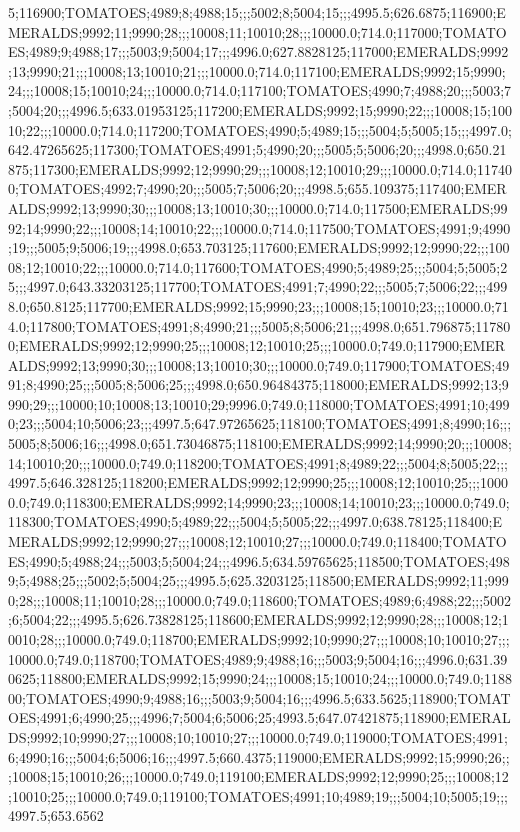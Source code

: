 5;116900;TOMATOES;4989;8;4988;15;;;5002;8;5004;15;;;4995.5;626.6875;116900;EMERALDS;9992;11;9990;28;;;10008;11;10010;28;;;10000.0;714.0;117000;TOMATOES;4989;9;4988;17;;;5003;9;5004;17;;;4996.0;627.8828125;117000;EMERALDS;9992;13;9990;21;;;10008;13;10010;21;;;10000.0;714.0;117100;EMERALDS;9992;15;9990;24;;;10008;15;10010;24;;;10000.0;714.0;117100;TOMATOES;4990;7;4988;20;;;5003;7;5004;20;;;4996.5;633.01953125;117200;EMERALDS;9992;15;9990;22;;;10008;15;10010;22;;;10000.0;714.0;117200;TOMATOES;4990;5;4989;15;;;5004;5;5005;15;;;4997.0;642.47265625;117300;TOMATOES;4991;5;4990;20;;;5005;5;5006;20;;;4998.0;650.21875;117300;EMERALDS;9992;12;9990;29;;;10008;12;10010;29;;;10000.0;714.0;117400;TOMATOES;4992;7;4990;20;;;5005;7;5006;20;;;4998.5;655.109375;117400;EMERALDS;9992;13;9990;30;;;10008;13;10010;30;;;10000.0;714.0;117500;EMERALDS;9992;14;9990;22;;;10008;14;10010;22;;;10000.0;714.0;117500;TOMATOES;4991;9;4990;19;;;5005;9;5006;19;;;4998.0;653.703125;117600;EMERALDS;9992;12;9990;22;;;10008;12;10010;22;;;10000.0;714.0;117600;TOMATOES;4990;5;4989;25;;;5004;5;5005;25;;;4997.0;643.33203125;117700;TOMATOES;4991;7;4990;22;;;5005;7;5006;22;;;4998.0;650.8125;117700;EMERALDS;9992;15;9990;23;;;10008;15;10010;23;;;10000.0;714.0;117800;TOMATOES;4991;8;4990;21;;;5005;8;5006;21;;;4998.0;651.796875;117800;EMERALDS;9992;12;9990;25;;;10008;12;10010;25;;;10000.0;749.0;117900;EMERALDS;9992;13;9990;30;;;10008;13;10010;30;;;10000.0;749.0;117900;TOMATOES;4991;8;4990;25;;;5005;8;5006;25;;;4998.0;650.96484375;118000;EMERALDS;9992;13;9990;29;;;10000;10;10008;13;10010;29;9996.0;749.0;118000;TOMATOES;4991;10;4990;23;;;5004;10;5006;23;;;4997.5;647.97265625;118100;TOMATOES;4991;8;4990;16;;;5005;8;5006;16;;;4998.0;651.73046875;118100;EMERALDS;9992;14;9990;20;;;10008;14;10010;20;;;10000.0;749.0;118200;TOMATOES;4991;8;4989;22;;;5004;8;5005;22;;;4997.5;646.328125;118200;EMERALDS;9992;12;9990;25;;;10008;12;10010;25;;;10000.0;749.0;118300;EMERALDS;9992;14;9990;23;;;10008;14;10010;23;;;10000.0;749.0;118300;TOMATOES;4990;5;4989;22;;;5004;5;5005;22;;;4997.0;638.78125;118400;EMERALDS;9992;12;9990;27;;;10008;12;10010;27;;;10000.0;749.0;118400;TOMATOES;4990;5;4988;24;;;5003;5;5004;24;;;4996.5;634.59765625;118500;TOMATOES;4989;5;4988;25;;;5002;5;5004;25;;;4995.5;625.3203125;118500;EMERALDS;9992;11;9990;28;;;10008;11;10010;28;;;10000.0;749.0;118600;TOMATOES;4989;6;4988;22;;;5002;6;5004;22;;;4995.5;626.73828125;118600;EMERALDS;9992;12;9990;28;;;10008;12;10010;28;;;10000.0;749.0;118700;EMERALDS;9992;10;9990;27;;;10008;10;10010;27;;;10000.0;749.0;118700;TOMATOES;4989;9;4988;16;;;5003;9;5004;16;;;4996.0;631.390625;118800;EMERALDS;9992;15;9990;24;;;10008;15;10010;24;;;10000.0;749.0;118800;TOMATOES;4990;9;4988;16;;;5003;9;5004;16;;;4996.5;633.5625;118900;TOMATOES;4991;6;4990;25;;;4996;7;5004;6;5006;25;4993.5;647.07421875;118900;EMERALDS;9992;10;9990;27;;;10008;10;10010;27;;;10000.0;749.0;119000;TOMATOES;4991;6;4990;16;;;5004;6;5006;16;;;4997.5;660.4375;119000;EMERALDS;9992;15;9990;26;;;10008;15;10010;26;;;10000.0;749.0;119100;EMERALDS;9992;12;9990;25;;;10008;12;10010;25;;;10000.0;749.0;119100;TOMATOES;4991;10;4989;19;;;5004;10;5005;19;;;4997.5;653.6562